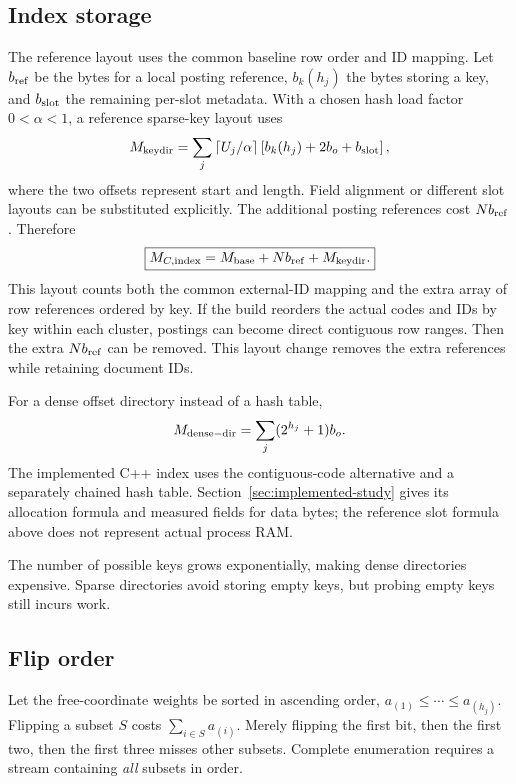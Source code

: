\subsection{Index storage}
The reference layout uses the common baseline row order and ID mapping. Let $b_{\rm ref}$ be the bytes for a local
posting reference, $b_k(h_j)$ the bytes storing a key, and $b_{\rm slot}$ the remaining per-slot
metadata. With a chosen hash load factor $0<\alpha<1$, a reference sparse-key layout uses
\begin{equation}
M_{\rm keydir}=\sum_j\left\lceil U_j/\alpha\right\rceil
                 \left[b_k(h_j)+2b_o+b_{\rm slot}\right],
\label{eq:hash-storage}
\end{equation}
where the two offsets represent start and length. Field alignment or different slot layouts
can be substituted explicitly. The additional posting references cost $N b_{\rm ref}$.
Therefore
\begin{equation}
\boxed{M_{C,\rm index}=M_{\mathrm{base}}+N b_{\rm ref}+M_{\rm keydir}.}
\label{eq:keys-storage}
\end{equation}
This layout counts both the common external-ID mapping and the extra
array of row references ordered by key. If the build reorders the actual codes and IDs by key within each
cluster, postings can become direct contiguous row ranges. Then the extra $N b_{\rm ref}$ can
be removed. This layout change removes the extra references while retaining document IDs.

For a dense offset directory instead of a hash table,
\[
M_{\rm dense-dir}=\sum_j(2^{h_j}+1)b_o.
\]
The implemented C++ index uses the contiguous-code alternative and a separately chained
hash table. Section~\ref{sec:implemented-study} gives its allocation formula and measured
fields for data bytes; the reference slot formula above does not represent actual process RAM.

The number of possible keys grows exponentially, making dense directories expensive. Sparse directories avoid storing
empty keys, but probing empty keys still incurs work.

\subsection{Flip order}
Let the free-coordinate weights be sorted in ascending order,
$a_{(1)}\leq\cdots\leq a_{(h_j)}$. Flipping a subset $S$ costs
$\sum_{i\in S}a_{(i)}$. Merely flipping the first bit, then the first two, then the first three
misses other subsets. Complete enumeration requires a stream containing \emph{all} subsets in order.

